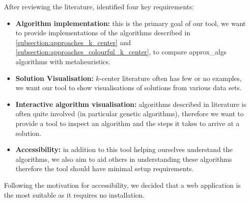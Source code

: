 After reviewing the literature, identified four key requirements:
\begin{itemize}
    \item \textbf{Algorithm implementation:} this is the primary goal of our tool, we want to provide implementations of the algorithms described in \cref{subsection:approaches_k_center} and \cref{subsection:approaches_colourful_k_center}, to compare \gls{approx_algs} algorithms with \glspl{metaheuristic}.
    \item  \textbf{Solution Visualisation:} $k$-center literature often has few or no examples, we want our tool to show visualisations of solutions from various data sets.
    \item  \textbf{Interactive algorithm visualisation:} algorithms described in literature is often quite involved (in particular genetic algorithms), therefore we want to provide a tool to inspect an algorithm and the steps it takes to arrive at a solution.
    \item  \textbf{Accessibility:} in addition to this tool helping ourselves understand the algorithms, we also aim to aid others in understanding these algorithms therefore the tool should have minimal setup requirements.
\end{itemize}

Following the motivation for accessibility, we decided that a web application is the most suitable as it requires no installation.